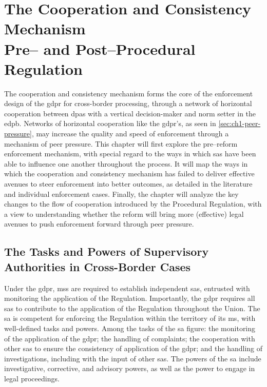 \section[The Cooperation and Consistency Mechanism Pre-- and Post--Procedural Regulation]{The Cooperation and Consistency Mechanism\\Pre-- and Post--Procedural Regulation}
\label{sec:ch3-cooperation-consistency-mechanism}

The cooperation and consistency mechanism forms the core of the enforcement design of the \gls{gdpr} for cross-border processing, through a network of horizontal cooperation between \glspl{dpa} with a vertical decision-maker and norm setter in the \gls{edpb}.
Networks of horizontal cooperation like the \gls{gdpr}'s, as seen in \cref{sec:ch1-peer-pressure}, may increase the quality and speed of enforcement through a mechanism of peer pressure.\autocites[466]{hofmannmustertScholtenHandbook2023}[428]{mastenbroekFillingGapEuropean2018}
This chapter will first explore the pre--reform enforcement mechanism, with special regard to the ways in which \glspl{sa} have been able to influence one another throughout the process.
It will map the ways in which the cooperation and consistency mechanism has failed to deliver effective avenues to steer enforcement into better outcomes, as detailed in the literature and individual enforcement cases.
Finally, the chapter will analyze the key changes to the flow of cooperation introduced by the Procedural Regulation, with a view to understanding whether the reform will bring more (effective) legal avenues to push enforcement forward through peer pressure.

\subsection{The Tasks and Powers of Supervisory Authorities in Cross-Border Cases}
\label{sec:ch3-tasks-powers}

Under the \gls{gdpr}, \glspl{ms} are required to establish independent\autocite[52]{GDPR} \glspl{sa}, entrusted with monitoring the application of the Regulation.\autocite[51]{GDPR} 
Importantly, the \gls{gdpr} requires all \glspl{sa} to contribute to the application of the Regulation throughout the Union.\autocite[51(2)]{GDPR} 
The \gls{sa} is competent for enforcing the Regulation within the territory of its \gls{ms},\autocite[51(1)]{GDPR} with well-defined tasks\autocite[57]{GDPR} and powers\autocite[58]{GDPR}.
Among the tasks of the \gls{sa} figure: the monitoring of the application of the \gls{gdpr};\autocite[57(1)(a)]{GDPR} the handling of complaints;\autocite[57(1)(f)]{GDPR} the cooperation with other \glspl{sa} to ensure the consistency of application of the \gls{gdpr};\autocite[57(1)(g)]{GDPR} and the handling of investigations, including with the input of other \glspl{sa}.\autocite[57(1)(h)]{GDPR}
The powers of the \gls{sa} include investigative, corrective, and advisory powers, as well as the power to engage in legal proceedings.\autocite[58]{GDPR}

